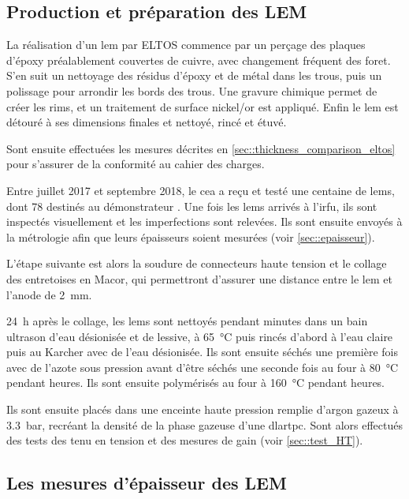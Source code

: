     \subsection{Production et préparation des LEM}
        
      La réalisation d'un \gls{lem} par ELTOS commence par un perçage des plaques d'époxy préalablement couvertes de cuivre, avec changement fréquent des foret. S'en suit un nettoyage des résidus d'époxy et de métal dans les trous, puis un polissage pour arrondir les bords des trous. Une gravure chimique permet de créer les rims, et un traitement de surface nickel/or est appliqué. Enfin le \gls{lem} est détouré à ses dimensions finales et nettoyé, rincé et étuvé.
          
      Sont ensuite effectuées les mesures décrites en \autoref{sec::thickness_comparison_eltos} pour s'assurer de la conformité au cahier des charges.
      
      Entre juillet 2017 et septembre 2018, le \gls{cea} a reçu et testé une centaine de \glspl{lem}, dont 78 destinés au démonstrateur \SSS{}. Une fois les \glspl{lem} arrivés à l'\gls{irfu}, ils sont inspectés visuellement et les imperfections sont relevées. Ils sont ensuite envoyés à la métrologie afin que leurs épaisseurs soient mesurées (voir \autoref{sec::epaisseur}).
      
      L'étape suivante est alors la soudure de connecteurs haute tension et le collage des entretoises en Macor, qui permettront d'assurer une distance entre le \gls{lem} et l'anode de \SI{2}{\milli\meter}.
      
      \SI{24}{\hour} après le collage, les \glspl{lem} sont nettoyés pendant  minutes dans un bain ultrason d'eau désionisée et de lessive, à \SI{65}{\celsius} puis rincés d'abord à l'eau claire puis au Karcher avec de l'eau désionisée. Ils sont ensuite séchés une première fois avec de l'azote sous pression avant d'être séchés une seconde fois au four à \SI{80}{\celsius} pendant  heures. Ils sont ensuite polymérisés au four à \SI{160}{\celsius} pendant  heures.

      Ils sont ensuite placés dans une enceinte haute pression remplie d'argon gazeux à \SI{3.3}{\bar}, recréant la densité de la phase gazeuse d'une \gls{dlartpc}. Sont alors effectués des tests des tenu en tension et des mesures de gain (voir \autoref{sec::test_HT}).
        
    \subsection{Les mesures d’épaisseur des LEM}\label{sec::epaisseur}
        
